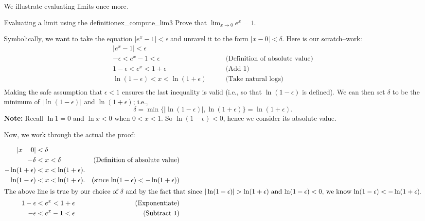 %
We illustrate evaluating limits once more.\\


\begin{example}{Evaluating a limit using the definition}{ex_compute_lim3}
{Prove that $\displaystyle \lim_{x\rightarrow 0} e^x = 1 $.}
\end{example}


\begin{solution}
{Symbolically, we want to take the equation $|e^x - 1| < \epsilon$ and unravel it to the form $|x-0| < \delta$.  Here is our scratch--work:
\begin{eqnarray*}
|e^x - 1| < \epsilon&\\
-\epsilon < e^x - 1 < \epsilon& \qquad \textrm{(Definition of absolute value)}\\
1-\epsilon < e^x < 1+\epsilon & \qquad \textrm{(Add 1)}\\
\ln(1-\epsilon) < x < \ln(1+\epsilon) & \qquad \textrm{(Take natural logs)}\\
\end{eqnarray*}
Making the safe assumption that $\epsilon<1$ ensures the last inequality is valid (i.e., so that $\ln (1-\epsilon)$ is defined). We can then set $\delta$ to be the minimum of $|\ln(1-\epsilon)|$ and $\ln(1+\epsilon)$; i.e.,  %
$$\delta = \min\{|\ln(1-\epsilon)|, \ln(1+\epsilon)\} = \ln(1+\epsilon).$$  
{\textbf{Note:} Recall $\ln 1= 0$ and $\ln x<0$ when $0<x<1$. So $\ln (1-\epsilon) <0$, hence we consider its absolute value.}

Now, we work through the actual the proof:


\begin{align*}
|x - 0|&<\delta\\
-\delta &< x < \delta &  \textrm{(Definition of absolute value)}\\
-\ln(1+\epsilon) &< x < \ln(1+\epsilon). &\\  
\ln(1-\epsilon) &< x < \ln(1+\epsilon). & \text{(since $\ln(1-\epsilon) < -\ln(1+\epsilon)$)}\\ 
\intertext{The above line is true by our choice of $\delta$ and by the fact that since $|\ln(1-\epsilon)|>\ln(1+\epsilon)$ and $\ln(1-\epsilon)<0$, we know $\ln(1-\epsilon) < -\ln(1+\epsilon )$.} %
1-\epsilon &< e^x < 1+\epsilon &  \textrm{(Exponentiate)}\\
-\epsilon &< e^x - 1 < \epsilon &  \textrm{(Subtract 1)}\\
\end{align*}

}
\end{solution}
